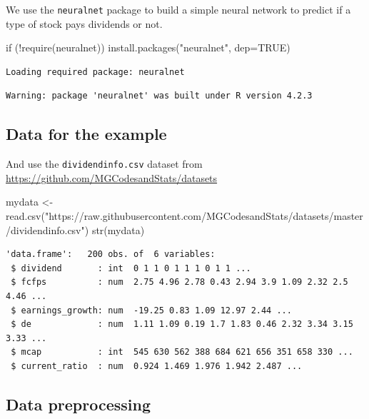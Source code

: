 \documentclass[
  letterpaper,
  DIV=11,
  numbers=noendperiod]{scrartcl}
\newenvironment{Shaded}{\begin{snugshade}}{\end{snugshade}}
\newcommand{\AttributeTok}[1]{\textcolor[rgb]{0.40,0.45,0.13}{#1}}
\newcommand{\ConstantTok}[1]{\textcolor[rgb]{0.56,0.35,0.01}{#1}}
\newcommand{\ControlFlowTok}[1]{\textcolor[rgb]{0.00,0.23,0.31}{#1}}
\newcommand{\FunctionTok}[1]{\textcolor[rgb]{0.28,0.35,0.67}{#1}}
\newcommand{\NormalTok}[1]{\textcolor[rgb]{0.00,0.23,0.31}{#1}}
\newcommand{\OtherTok}[1]{\textcolor[rgb]{0.00,0.23,0.31}{#1}}
\newcommand{\SpecialCharTok}[1]{\textcolor[rgb]{0.37,0.37,0.37}{#1}}
\newcommand{\StringTok}[1]{\textcolor[rgb]{0.13,0.47,0.30}{#1}}
\begin{document}
We use the \texttt{neuralnet} package to build a simple neural network
to predict if a type of stock pays dividends or not.

\begin{Shaded}
\begin{Highlighting}[]
\ControlFlowTok{if}\NormalTok{ (}\SpecialCharTok{!}\FunctionTok{require}\NormalTok{(neuralnet)) }
  \FunctionTok{install.packages}\NormalTok{(}\StringTok{"neuralnet"}\NormalTok{, }\AttributeTok{dep=}\ConstantTok{TRUE}\NormalTok{)}
\end{Highlighting}
\end{Shaded}

\begin{verbatim}
Loading required package: neuralnet
\end{verbatim}

\begin{verbatim}
Warning: package 'neuralnet' was built under R version 4.2.3
\end{verbatim}

\hypertarget{data-for-the-example}{%
\subsection{Data for the example}\label{data-for-the-example}}

And use the \texttt{dividendinfo.csv} dataset from
\url{https://github.com/MGCodesandStats/datasets}

\begin{Shaded}
\begin{Highlighting}[]
\NormalTok{mydata }\OtherTok{\textless{}{-}} \FunctionTok{read.csv}\NormalTok{(}\StringTok{"https://raw.githubusercontent.com/MGCodesandStats/datasets/master/dividendinfo.csv"}\NormalTok{)}
\FunctionTok{str}\NormalTok{(mydata)}
\end{Highlighting}
\end{Shaded}

\begin{verbatim}
'data.frame':   200 obs. of  6 variables:
 $ dividend       : int  0 1 1 0 1 1 1 0 1 1 ...
 $ fcfps          : num  2.75 4.96 2.78 0.43 2.94 3.9 1.09 2.32 2.5 4.46 ...
 $ earnings_growth: num  -19.25 0.83 1.09 12.97 2.44 ...
 $ de             : num  1.11 1.09 0.19 1.7 1.83 0.46 2.32 3.34 3.15 3.33 ...
 $ mcap           : int  545 630 562 388 684 621 656 351 658 330 ...
 $ current_ratio  : num  0.924 1.469 1.976 1.942 2.487 ...
\end{verbatim}

\hypertarget{data-preprocessing}{%
\subsection{Data preprocessing}\label{data-preprocessing}}
\end{document}
